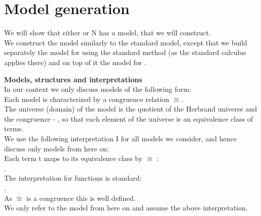 \section*{Model generation}
We will show that either  or N has a model, that we will construct.\\
We construct the model similarly to the standard model, except that we build separately the model for  using the standard method (as the standard calculus applies there) and on top of it the model for .

\textbf{Models, structures and interpretations}\\
In our context we only discuss models of the following form:\\
Each model is characterized by a congruence relation $\cong$.\\
The universe (domain) of the model is the quotient of the Herbrand universe and the congruence - \m{\Ts{\Sigma} / \cong}, so that each element of the universe is an equivalence class of terms.\\
We use the following interpretation I for all models we consider, and hence discuss only models from here on:\\
Each term t maps to its equivalence class by $\cong$ :\\
.\\
The interpretation for functions is standard: \\
.\\
As $\cong$ is a congruence this is well defined.\\
We only refer to the model from here on and assume the above interpretation.

